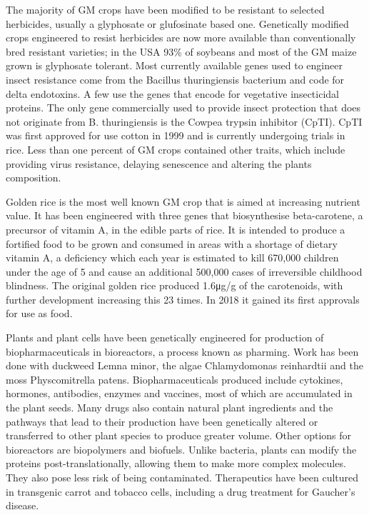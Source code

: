 The majority of GM crops have been modified to be resistant to selected herbicides, usually a glyphosate or glufosinate based one. Genetically modified crops engineered to resist herbicides are now more available than conventionally bred resistant varieties; in the USA 93\% of soybeans and most of the GM maize grown is glyphosate tolerant. Most currently available genes used to engineer insect resistance come from the Bacillus thuringiensis bacterium and code for delta endotoxins. A few use the genes that encode for vegetative insecticidal proteins. The only gene commercially used to provide insect protection that does not originate from B. thuringiensis is the Cowpea trypsin inhibitor (CpTI). CpTI was first approved for use cotton in 1999 and is currently undergoing trials in rice. Less than one percent of GM crops contained other traits, which include providing virus resistance, delaying senescence and altering the plants composition.

Golden rice is the most well known GM crop that is aimed at increasing nutrient value. It has been engineered with three genes that biosynthesise beta-carotene, a precursor of vitamin A, in the edible parts of rice. It is intended to produce a fortified food to be grown and consumed in areas with a shortage of dietary vitamin A, a deficiency which each year is estimated to kill 670,000 children under the age of 5 and cause an additional 500,000 cases of irreversible childhood blindness. The original golden rice produced 1.6μg/g of the carotenoids, with further development increasing this 23 times. In 2018 it gained its first approvals for use as food.

Plants and plant cells have been genetically engineered for production of biopharmaceuticals in bioreactors, a process known as pharming. Work has been done with duckweed Lemna minor, the algae Chlamydomonas reinhardtii and the moss Physcomitrella patens. Biopharmaceuticals produced include cytokines, hormones, antibodies, enzymes and vaccines, most of which are accumulated in the plant seeds. Many drugs also contain natural plant ingredients and the pathways that lead to their production have been genetically altered or transferred to other plant species to produce greater volume. Other options for bioreactors are biopolymers and biofuels. Unlike bacteria, plants can modify the proteins post-translationally, allowing them to make more complex molecules. They also pose less risk of being contaminated. Therapeutics have been cultured in transgenic carrot and tobacco cells, including a drug treatment for Gaucher's disease.

